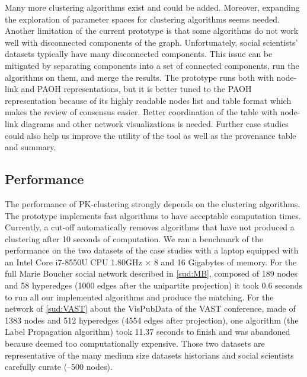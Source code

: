 Many more clustering algorithms exist and could be added.
Moreover, expanding the exploration of parameter spaces for clustering algorithms seems needed.  Another limitation of the current prototype is that some algorithms do not work well with disconnected components of the graph. Unfortunately, social scientists' datasets typically have many disconnected components. This issue can be mitigated by separating components into a set of connected components, run the algorithms on them, and merge the results.
The prototype runs both with node-link and PAOH representations, but it is better tuned to the PAOH representation because of its highly readable nodes list and table format which makes the review of consensus easier. Better coordination of the table with node-link diagrams and other network visualizations is needed.
Further case studies could also help us improve the utility of the tool as well as the provenance table and summary.

\subsection{Performance}
\label{sub:performances}

The performance of PK-clustering strongly depends on the clustering algorithms. The prototype implements fast algorithms to have acceptable computation times.  Currently, a cut-off automatically removes algorithms that have not produced a clustering after 10 seconds of computation.
We ran a benchmark of the performance on the two datasets of the case studies with a laptop equipped with an Intel Core i7-8550U CPU 1.80GHz × 8 and 16 Gigabytes of memory.
For the full Marie Boucher social network described in \autoref{sud:MB}, composed of 189 nodes and 58 hyperedges (1000 edges after the unipartite projection) it took 0.6 seconds to run all our implemented algorithms and produce the matching.
For the network of \autoref{sud:VAST} about the VisPubData of the VAST conference, made of 1383 nodes and 512 hyperedges (4554 edges after projection), one algorithm (the Label Propagation algorithm) took 11.37 seconds to finish and was abandoned because deemed too computationally expensive.
Those two datasets are representative of the many medium size datasets historians and social scientists carefully curate (--500 nodes).

